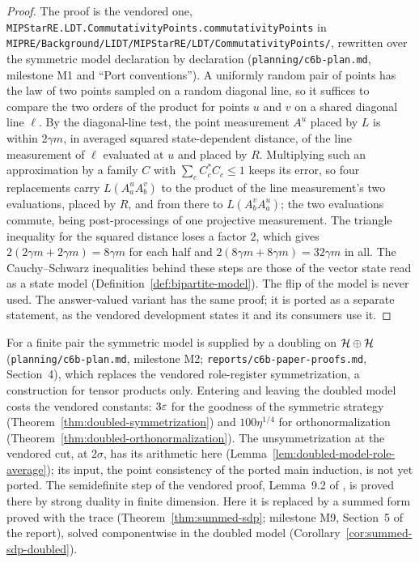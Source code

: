 \begin{proof}
\leanok
The proof is the vendored one, \texttt{MIPStarRE.LDT.CommutativityPoints.commutativityPoints} in
\texttt{MIPRE/Background/LIDT/MIPStarRE/LDT/CommutativityPoints/}, rewritten over the symmetric
model declaration by declaration (\texttt{planning/c6b-plan.md}, milestone M1 and ``Port
conventions''). A uniformly random pair of points has the law of two points sampled on a random
diagonal line, so it suffices to compare the two orders of the product for points $u$ and $v$ on a
shared diagonal line $\ell$. By the diagonal-line test, the point measurement $A^u$ placed by $L$ is
within $2 \gamma m$, in averaged squared state-dependent distance, of the line measurement of $\ell$
evaluated at $u$ and placed by $R$. Multiplying such an approximation by a family $C$ with $\sum_c
C_c^* C_c \leq 1$ keeps its error, so four replacements carry $L(A^u_a A^v_b)$ to the product of
the line measurement's two evaluations, placed by $R$, and from there to $L(A^v_b A^u_a)$; the two
evaluations commute, being post-processings of one projective measurement. The triangle inequality
for the squared distance loses a factor $2$, which gives $2 (2 \gamma m + 2 \gamma m) = 8 \gamma m$
for each half and $2 (8 \gamma m + 8 \gamma m) = 32 \gamma m$ in all. The Cauchy--Schwarz
inequalities behind these steps are those of the vector state read as a state model
(Definition~\ref{def:bipartite-model}). The flip of the model is never used. The answer-valued
variant has the same proof; it is ported as a separate statement, as the vendored development
states it and its consumers use it.
\end{proof}

For a finite pair the symmetric model is supplied by a doubling on $\mathcal{H} \oplus \mathcal{H}$
(\texttt{planning/c6b-plan.md}, milestone M2; \texttt{reports/c6b-paper-proofs.md}, Section~4),
which replaces the vendored role-register symmetrization, a construction for tensor products only.
Entering and leaving the doubled model costs the vendored constants: $3\varepsilon$ for the goodness of the
symmetric strategy (Theorem~\ref{thm:doubled-symmetrization}) and $100 \eta^{1/4}$ for
orthonormalization (Theorem~\ref{thm:doubled-orthonormalization}). The unsymmetrization at the
vendored cut, at $2\sigma$, has its arithmetic here (Lemma~\ref{lem:doubled-model-role-average});
its input, the point consistency of the ported main induction, is not yet ported. The semidefinite
step of the vendored proof, Lemma~9.2 of \cite{JNVWY21qld}, is proved there by strong duality in
finite dimension. Here it is replaced by a summed form proved with the trace
(Theorem~\ref{thm:summed-sdp}; milestone M9, Section~5 of the report), solved componentwise in the
doubled model (Corollary~\ref{cor:summed-sdp-doubled}).

